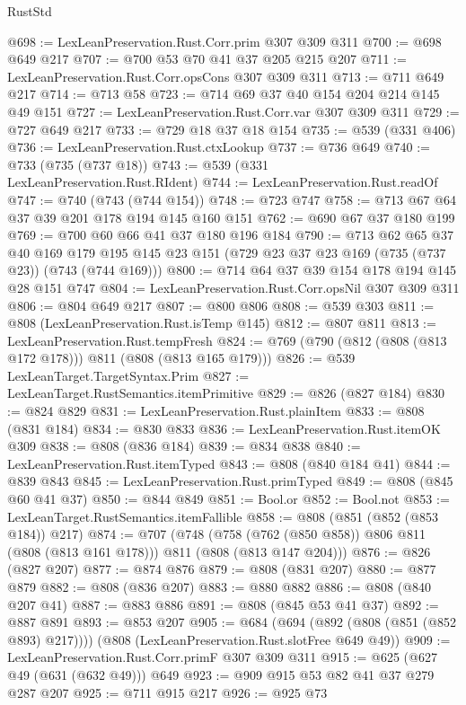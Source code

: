 \begin{lexlean}{RustStd}
\begin{coremodule}
@698 := LexLeanPreservation.Rust.Corr.prim @307 @309 @311
@700 := @698 @649 @217
@707 := @700 @53 @70 @41 @37 @205 @215 @207
@711 := LexLeanPreservation.Rust.Corr.opsCons @307 @309 @311
@713 := @711 @649 @217
@714 := @713 @58
@723 := @714 @69 @37 @40 @154 @204 @214 @145 @49 @151
@727 := LexLeanPreservation.Rust.Corr.var @307 @309 @311
@729 := @727 @649 @217
@733 := @729 @18 @37 @18 @154
@735 := @539 (@331 @406)
@736 := LexLeanPreservation.Rust.ctxLookup
@737 := @736 @649
@740 := @733 (@735 (@737 @18))
@743 := @539 (@331 LexLeanPreservation.Rust.RIdent)
@744 := LexLeanPreservation.Rust.readOf
@747 := @740 (@743 (@744 @154))
@748 := @723 @747
@758 := @713 @67 @64 @37 @39 @201 @178 @194 @145 @160 @151
@762 := @690 @67 @37 @180 @199
@769 := @700 @60 @66 @41 @37 @180 @196 @184
@790 := @713
    @62
    @65
    @37
    @40
    @169
    @179
    @195
    @145
    @23
    @151
    (@729 @23 @37 @23 @169 (@735 (@737 @23)) (@743 (@744 @169)))
@800 := @714 @64 @37 @39 @154 @178 @194 @145 @28 @151 @747
@804 := LexLeanPreservation.Rust.Corr.opsNil @307 @309 @311
@806 := @804 @649 @217
@807 := @800 @806
@808 := @539 @303
@811 := @808 (LexLeanPreservation.Rust.isTemp @145)
@812 := @807 @811
@813 := LexLeanPreservation.Rust.tempFresh
@824 := @769 (@790 (@812 (@808 (@813 @172 @178))) @811 (@808 (@813 @165 @179)))
@826 := @539 LexLeanTarget.TargetSyntax.Prim
@827 := LexLeanTarget.RustSemantics.itemPrimitive
@829 := @826 (@827 @184)
@830 := @824 @829
@831 := LexLeanPreservation.Rust.plainItem
@833 := @808 (@831 @184)
@834 := @830 @833
@836 := LexLeanPreservation.Rust.itemOK @309
@838 := @808 (@836 @184)
@839 := @834 @838
@840 := LexLeanPreservation.Rust.itemTyped
@843 := @808 (@840 @184 @41)
@844 := @839 @843
@845 := LexLeanPreservation.Rust.primTyped
@849 := @808 (@845 @60 @41 @37)
@850 := @844 @849
@851 := Bool.or
@852 := Bool.not
@853 := LexLeanTarget.RustSemantics.itemFallible
@858 := @808 (@851 (@852 (@853 @184)) @217)
@874 := @707
    (@748 (@758 (@762 (@850 @858)) @806 @811 (@808 (@813 @161 @178))) @811 (@808 (@813 @147 @204)))
@876 := @826 (@827 @207)
@877 := @874 @876
@879 := @808 (@831 @207)
@880 := @877 @879
@882 := @808 (@836 @207)
@883 := @880 @882
@886 := @808 (@840 @207 @41)
@887 := @883 @886
@891 := @808 (@845 @53 @41 @37)
@892 := @887 @891
@893 := @853 @207
@905 := @684
    (@694 (@892 (@808 (@851 (@852 @893) @217))))
    (@808 (LexLeanPreservation.Rust.slotFree @649 @49))
@909 := LexLeanPreservation.Rust.Corr.primF @307 @309 @311
@915 := @625 (@627 @49 (@631 (@632 @49))) @649
@923 := @909 @915 @53 @82 @41 @37 @279 @287 @207
@925 := @711 @915 @217
@926 := @925 @73

\end{coremodule}
\end{lexlean}
